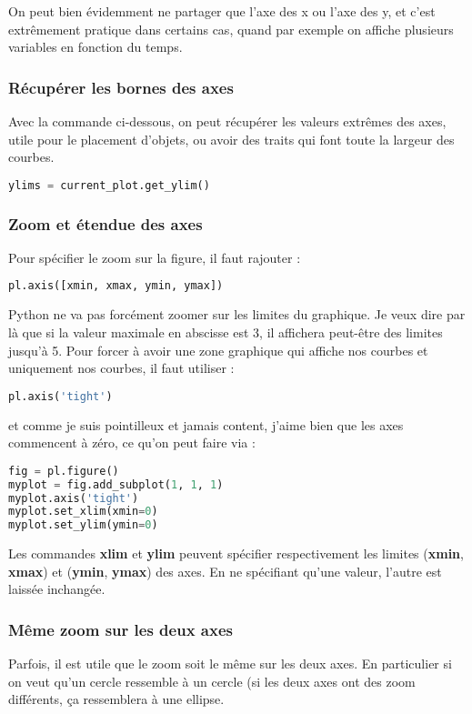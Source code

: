 \documentclass[a4paper,twoside]{article}
\begin{document}
\begin{remarque}
On peut bien évidemment ne partager que l'axe des x ou l'axe des y, et c'est extrêmement pratique dans certains cas, quand par exemple on affiche plusieurs variables en fonction du temps.
\end{remarque}

\subsubsection{Récupérer les bornes des axes}
Avec la commande ci-dessous, on peut récupérer les valeurs extrêmes des axes, utile pour le placement d'objets, ou avoir des traits qui font toute la largeur des courbes.
\begin{lstlisting}[language=python]
ylims = current_plot.get_ylim()
\end{lstlisting}

\subsubsection{Zoom et étendue des axes}

Pour spécifier le zoom sur la figure, il faut rajouter :
\begin{lstlisting}[language=python]
pl.axis([xmin, xmax, ymin, ymax])
\end{lstlisting}

Python ne va pas forcément zoomer sur les limites du graphique. Je veux dire par là que si la valeur maximale en abscisse est 3, il affichera peut-être des limites jusqu'à 5. Pour forcer à avoir une zone graphique qui affiche nos courbes et uniquement nos courbes, il faut utiliser :
\begin{lstlisting}[language=python]
pl.axis('tight')
\end{lstlisting}

et comme je suis pointilleux et jamais content, j'aime bien que les axes commencent à zéro, ce qu'on peut faire via :
\begin{lstlisting}[language=python]
fig = pl.figure()
myplot = fig.add_subplot(1, 1, 1)
myplot.axis('tight')
myplot.set_xlim(xmin=0)
myplot.set_ylim(ymin=0)
\end{lstlisting}

Les commandes \textbf{xlim} et \textbf{ylim} peuvent spécifier respectivement les limites (\textbf{xmin}, \textbf{xmax}) et (\textbf{ymin}, \textbf{ymax}) des axes. En ne spécifiant qu'une valeur, l'autre est laissée inchangée.

\subsubsection{Même zoom sur les deux axes}
Parfois, il est utile que le zoom soit le même sur les deux axes. En particulier si on veut qu'un cercle ressemble à un cercle (si les deux axes ont des zoom différents, ça ressemblera à une ellipse. 
\end{document}
